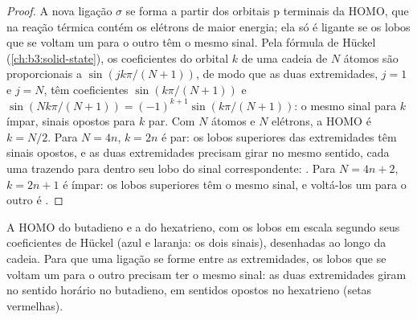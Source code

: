 \begin{proof}
A nova ligação $\sigma$ se forma a partir dos orbitais p terminais da HOMO, que na
reação térmica contém os elétrons de maior energia; ela só é ligante se os
lobos que se voltam um para o outro têm o mesmo sinal. Pela fórmula de Hückel
(\cref{ch:b3:solid-state}), os coeficientes do orbital $k$ de uma cadeia de $N$ átomos são
proporcionais a $\sin(jk\pi/(N + 1))$, de modo que as duas extremidades, $j = 1$ e $j = N$, têm
coeficientes $\sin(k\pi/(N + 1))$ e $\sin(Nk\pi/(N + 1)) = (-1)^{k+1}\sin(k\pi/(N + 1))$: o mesmo sinal para $k$ ímpar,
sinais opostos para $k$ par. Com $N$ átomos e $N$ elétrons, a HOMO é
$k = N/2$. Para $N = 4n$, $k = 2n$ é par: os lobos superiores das extremidades têm sinais
opostos, e as duas extremidades precisam girar no mesmo sentido, cada uma trazendo para dentro seu lobo
do sinal correspondente: . Para $N = 4n + 2$, $k = 2n + 1$ é ímpar: os lobos superiores
têm o mesmo sinal, e voltá-los um para o outro é .
\end{proof}

\begin{omfigure}

{\small A HOMO do butadieno e a do hexatrieno, com os lobos em escala segundo seus
coeficientes de Hückel (azul e laranja: os dois sinais), desenhadas ao longo da cadeia.
Para que uma ligação se forme entre as extremidades, os lobos que se voltam um para o outro
precisam ter o mesmo sinal: as duas extremidades giram no sentido horário no butadieno, em
sentidos opostos no hexatrieno (setas vermelhas).}
\end{omfigure}

